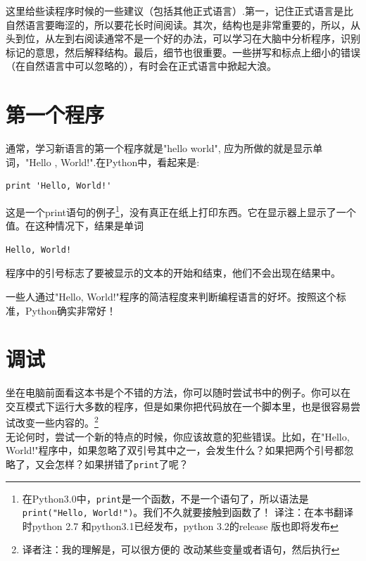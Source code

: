 \documentclass[10pt]{book}
\begin{document}
这里给些读程序时候的一些建议（包括其他正式语言）.第一，记住正式语言是比自然语言要晦涩的，所以要花长时间阅读。其次，结构也是非常重要的，所以，从头到位，从左到右阅读通常不是一个好的办法，可以学习在大脑中分析程序，识别标记的意思，然后解释结构。最后，细节也很重要。一些拼写和标点上细小的错误（在自然语言中可以忽略的），有时会在正式语言中掀起大浪。

\section{第一个程序}
\label{hello}

通常，学习新语言的第一个程序就是"hello world", 应为所做的就是显示单词，"Hello , World!".在Python中，看起来是:

\beforeverb
\begin{verbatim}
print 'Hello, World!'
\end{verbatim}
\afterverb

这是一个print语句的例子\footnote{在Python3.0中，{\tt print}是一个函数，不是一个语句了，所以语法是{\tt print("Hello, World!")}。我们不久就要接触到函数了！  译注：在本书翻译时python 2.7 和python3.1已经发布，python 3.2的release 版也即将发布}，没有真正在纸上打印东西。它在显示器上显示了一个值。在这种情况下，结果是单词


\beforeverb
\begin{verbatim}
Hello, World!
\end{verbatim}
\afterverb

程序中的引号标志了要被显示的文本的开始和结束，他们不会出现在结果中。


一些人通过"Hello, World!"程序的简洁程度来判断编程语言的好坏。按照这个标准，Python确实非常好！


\section{调试}

坐在电脑前面看这本书是个不错的方法，你可以随时尝试书中的例子。你可以在
交互模式下运行大多数的程序，但是如果你把代码放在一个脚本里，也是很容易尝试改变一些内容的。\footnote{译者注：我的理解是，可以很方便的
改动某些变量或者语句，然后执行}\\

无论何时，尝试一个新的特点的时候，你应该故意的犯些错误。比如，在"Hello, World!"程序中，如果忽略了双引号其中之一，会发生什么？如果把两个引号都忽略了，又会怎样？如果拼错了{\tt print}了呢？\\
\end{document}
